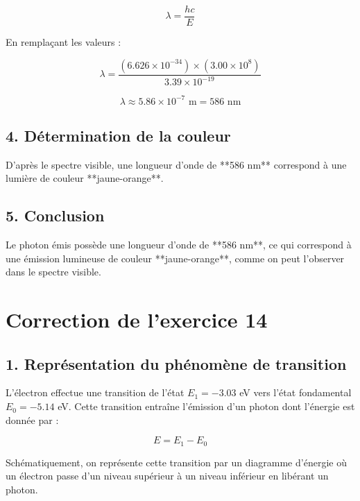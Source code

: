 \documentclass[a4paper,12pt]{article}
\begin{document}
\begin{equation}
    \lambda = \frac{h c}{E}
\end{equation}

En remplaçant les valeurs :

\begin{equation}
    \lambda = \frac{(6.626 \times 10^{-34}) \times (3.00 \times 10^8)}{3.39 \times 10^{-19}}
\end{equation}

\begin{equation}
    \lambda \approx 5.86 \times 10^{-7} \text{ m} = 586 \text{ nm}
\end{equation}

\subsection*{4. Détermination de la couleur}
D'après le spectre visible, une longueur d'onde de **586 nm** correspond à une lumière de couleur **jaune-orange**.

\subsection*{5. Conclusion}
Le photon émis possède une longueur d'onde de **586 nm**, ce qui correspond à une émission lumineuse de couleur **jaune-orange**, comme on peut l’observer dans le spectre visible.



\section*{Correction de l'exercice 14}

\subsection*{1. Représentation du phénomène de transition}
L’électron effectue une transition de l’état $E_1 = -3.03$ eV vers l’état fondamental $E_0 = -5.14$ eV. Cette transition entraîne l’émission d’un photon dont l’énergie est donnée par :

\begin{equation}
    E = E_1 - E_0
\end{equation}

Schématiquement, on représente cette transition par un diagramme d’énergie où un électron passe d’un niveau supérieur à un niveau inférieur en libérant un photon.
\end{document}
